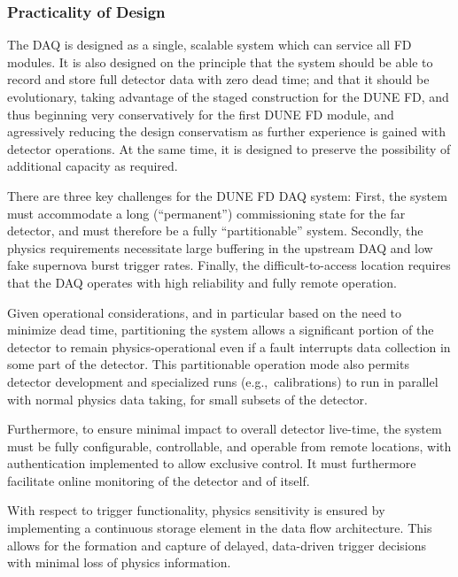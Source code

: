  

\subsubsection{Practicality of Design}

The DAQ is designed as a single, scalable system which can service
all FD modules. It is also designed on the principle that the system should be
able to record and store full detector data with zero dead time; and
that it should be evolutionary, taking advantage of the staged
construction for the DUNE FD, and thus beginning very conservatively
for the first DUNE FD module, and agressively reducing the design
conservatism as further experience is gained with detector
operations. At the same time, it is designed to preserve the possibility of additional capacity
as required.

There are three key challenges for the DUNE FD DAQ system: First, the system must accommodate
a long (``permanent'') commissioning state for the far detector, and
must therefore be a fully ``partitionable'' system. Secondly, the   physics
requirements necessitate large buffering in the upstream DAQ and low fake
supernova burst trigger rates. Finally, the difficult-to-access
location requires that the DAQ operates with high reliability and fully remote operation.

Given operational considerations, and in particular based
on the need to minimize  dead time, partitioning the  system allows 
a significant portion of the detector to remain physics-operational
even if a fault interrupts data collection in
some part of the detector. 
This partitionable operation mode also
permits detector development and specialized runs (e.g.,~calibrations)
to run in parallel with normal physics data taking, for small subsets
of the detector.

Furthermore, to ensure minimal impact to overall detector live-time, the  system must be fully configurable,
controllable, and operable from remote locations, with
authentication implemented to allow exclusive control. It must %
furthermore facilitate online monitoring of the detector and of itself. %

With respect to trigger functionality, physics sensitivity is ensured
by implementing a continuous storage element in the data flow
architecture. %
This allows for the formation and capture of delayed, data-driven trigger decisions with minimal loss of physics information.
 

